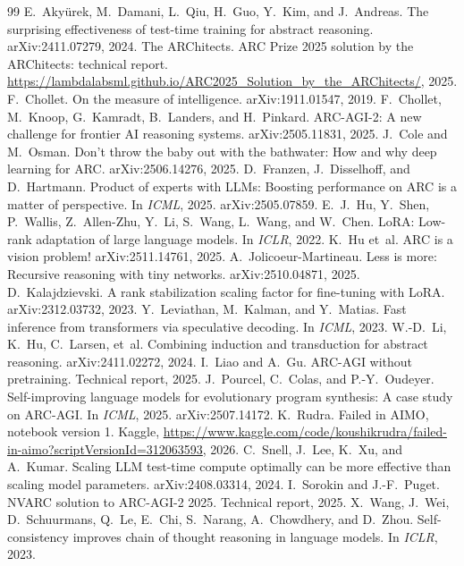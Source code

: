 \documentclass[10pt,twocolumn]{article}
\theoremstyle{plain}\newtheorem{proposition}{Proposition}
\theoremstyle{definition}\newtheorem{corollary}{Corollary}
\begin{document}
{\small
\begin{thebibliography}{99}\setlength{\itemsep}{1pt}
 E.~Aky{\"u}rek, M.~Damani, L.~Qiu, H.~Guo, Y.~Kim, and J.~Andreas. The surprising effectiveness of test-time training for abstract reasoning. arXiv:2411.07279, 2024.
 The ARChitects. ARC Prize 2025 solution by the ARChitects: technical report. \url{https://lambdalabsml.github.io/ARC2025_Solution_by_the_ARChitects/}, 2025.
 F.~Chollet. On the measure of intelligence. arXiv:1911.01547, 2019.
 F.~Chollet, M.~Knoop, G.~Kamradt, B.~Landers, and H.~Pinkard. ARC-AGI-2: A new challenge for frontier AI reasoning systems. arXiv:2505.11831, 2025.
 J.~Cole and M.~Osman. Don't throw the baby out with the bathwater: How and why deep learning for ARC. arXiv:2506.14276, 2025.
 D.~Franzen, J.~Disselhoff, and D.~Hartmann. Product of experts with LLMs: Boosting performance on ARC is a matter of perspective. In \emph{ICML}, 2025. arXiv:2505.07859.
 E.~J.~Hu, Y.~Shen, P.~Wallis, Z.~Allen-Zhu, Y.~Li, S.~Wang, L.~Wang, and W.~Chen. LoRA: Low-rank adaptation of large language models. In \emph{ICLR}, 2022.
 K.~Hu et~al. ARC is a vision problem! arXiv:2511.14761, 2025.
 A.~Jolicoeur-Martineau. Less is more: Recursive reasoning with tiny networks. arXiv:2510.04871, 2025.
 D.~Kalajdzievski. A rank stabilization scaling factor for fine-tuning with LoRA. arXiv:2312.03732, 2023.
 Y.~Leviathan, M.~Kalman, and Y.~Matias. Fast inference from transformers via speculative decoding. In \emph{ICML}, 2023.
 W.-D.~Li, K.~Hu, C.~Larsen, et~al. Combining induction and transduction for abstract reasoning. arXiv:2411.02272, 2024.
 I.~Liao and A.~Gu. ARC-AGI without pretraining. Technical report, 2025.
 J.~Pourcel, C.~Colas, and P.-Y.~Oudeyer. Self-improving language models for evolutionary program synthesis: A case study on ARC-AGI. In \emph{ICML}, 2025. arXiv:2507.14172.
 K.~Rudra. Failed in AIMO, notebook version 1. Kaggle, \url{https://www.kaggle.com/code/koushikrudra/failed-in-aimo?scriptVersionId=312063593}, 2026.
 C.~Snell, J.~Lee, K.~Xu, and A.~Kumar. Scaling LLM test-time compute optimally can be more effective than scaling model parameters. arXiv:2408.03314, 2024.
 I.~Sorokin and J.-F.~Puget. NVARC solution to ARC-AGI-2 2025. Technical report, 2025.
 X.~Wang, J.~Wei, D.~Schuurmans, Q.~Le, E.~Chi, S.~Narang, A.~Chowdhery, and D.~Zhou. Self-consistency improves chain of thought reasoning in language models. In \emph{ICLR}, 2023.
\end{thebibliography}
}
\end{document}
